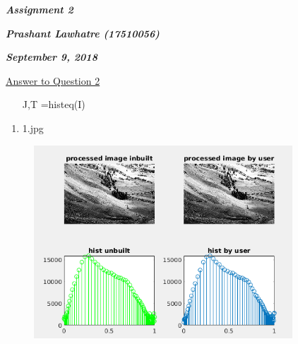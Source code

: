 \documentclass[12pt]{article}
\begin{document}
\begin{Center}
\textbf{\textit{Assignment 2}}
\end{Center}\par


\vspace{\baselineskip}
\begin{Center}
\textbf{\textit{Prashant Lawhatre (17510056)}}
\end{Center}\par


\vspace{\baselineskip}
\begin{Center}
\textbf{\textit{September 9, 2018}}
\end{Center}\par


\vspace{\baselineskip}

\vspace{\baselineskip}
\uline{Answer to Question 2}\par


\vspace{\baselineskip}
\begin{enumerate}
	\item [J,T]=histeq(I)
\end{enumerate}\par

\begin{enumerate}
	\item 1.jpg
\end{enumerate}\par




\begin{figure}[H]
	\begin{Center}
		\includegraphics[width=3.82in,height=2.85in]{./media/image8.png}
	\end{Center}
\end{figure}
\end{document}
